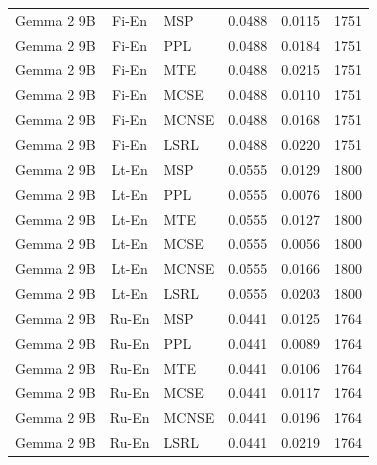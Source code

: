 \begin{table}
\begin{tabular}{lc}
Gemma 2 9B & Fi-En & MSP & 0.0488 & 0.0115 & 1751 \\
Gemma 2 9B & Fi-En & PPL & 0.0488 & 0.0184 & 1751 \\
Gemma 2 9B & Fi-En & MTE & 0.0488 & 0.0215 & 1751 \\
Gemma 2 9B & Fi-En & MCSE & 0.0488 & 0.0110 & 1751 \\
Gemma 2 9B & Fi-En & MCNSE & 0.0488 & 0.0168 & 1751 \\
Gemma 2 9B & Fi-En & LSRL & 0.0488 & 0.0220 & 1751 \\
Gemma 2 9B & Lt-En & MSP & 0.0555 & 0.0129 & 1800 \\
Gemma 2 9B & Lt-En & PPL & 0.0555 & 0.0076 & 1800 \\
Gemma 2 9B & Lt-En & MTE & 0.0555 & 0.0127 & 1800 \\
Gemma 2 9B & Lt-En & MCSE & 0.0555 & 0.0056 & 1800 \\
Gemma 2 9B & Lt-En & MCNSE & 0.0555 & 0.0166 & 1800 \\
Gemma 2 9B & Lt-En & LSRL & 0.0555 & 0.0203 & 1800 \\
Gemma 2 9B & Ru-En & MSP & 0.0441 & 0.0125 & 1764 \\
Gemma 2 9B & Ru-En & PPL & 0.0441 & 0.0089 & 1764 \\
Gemma 2 9B & Ru-En & MTE & 0.0441 & 0.0106 & 1764 \\
Gemma 2 9B & Ru-En & MCSE & 0.0441 & 0.0117 & 1764 \\
Gemma 2 9B & Ru-En & MCNSE & 0.0441 & 0.0196 & 1764 \\
Gemma 2 9B & Ru-En & LSRL & 0.0441 & 0.0219 & 1764 \\
\midrule
\end{tabular}
\end{table}
